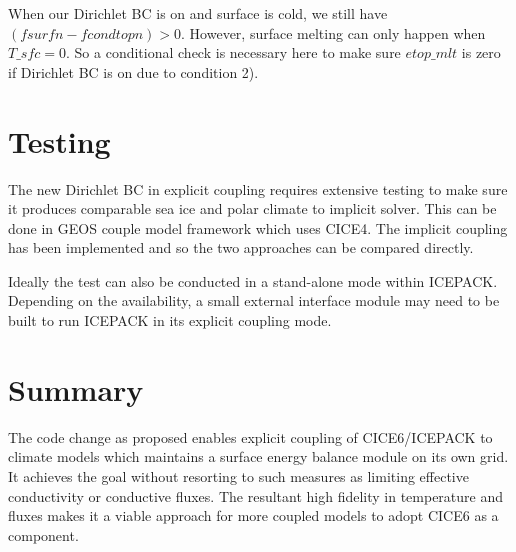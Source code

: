 \documentclass[10pt,letterpaper,oneside]{article}
\begin{document}
 When our Dirichlet BC is on and surface is cold, we still have  $(fsurfn - fcondtopn) > 0$. However, surface melting can only happen when $T\_sfc = 0$. So a conditional check is necessary here to make sure $etop\_mlt$ is zero if Dirichlet BC is on due to condition 2).
 
 \section{Testing}
  
 The new Dirichlet BC in explicit coupling requires extensive testing to make sure it produces comparable sea ice and polar climate to implicit solver. This can be done in GEOS couple model framework which uses CICE4. The implicit coupling has been implemented and so the two approaches can be compared directly. \newline
 
 Ideally the test can also be conducted in a stand-alone mode within ICEPACK. Depending on the availability, a small external interface module may need  to be built to run ICEPACK in its explicit coupling mode. 
       
 \section{Summary}


The code change as proposed enables explicit coupling of CICE6/ICEPACK to climate models which maintains a surface energy balance module on its own grid. It achieves the goal without resorting to such measures as limiting effective conductivity or conductive fluxes. The resultant high fidelity in temperature and fluxes makes it a viable approach for more coupled models to adopt CICE6 as a component.
           
\end{document}
